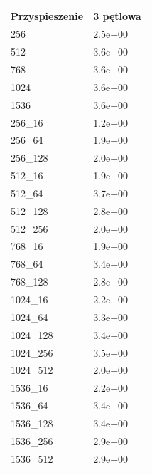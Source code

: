 \documentclass{scrartcl}
\begin{document}
\begin{table}[H]
\begin{tabular}{|l|l|}
\hline
Przyspieszenie & 3 pętlowa \\ \hline
256            & 2.5e+00   \\ \hline
512            & 3.6e+00   \\ \hline
768            & 3.6e+00   \\ \hline
1024           & 3.6e+00   \\ \hline
1536           & 3.6e+00   \\ \hline
256\_16        & 1.2e+00       \\ \hline
256\_64        & 1.9e+00       \\ \hline
256\_128       & 2.0e+00       \\ \hline
512\_16        & 1.9e+00       \\ \hline
512\_64        & 3.7e+00       \\ \hline
512\_128       & 2.8e+00       \\ \hline
512\_256       & 2.0e+00       \\ \hline
768\_16        & 1.9e+00       \\ \hline
768\_64        & 3.4e+00       \\ \hline
768\_128       & 2.8e+00       \\ \hline
1024\_16       & 2.2e+00       \\ \hline
1024\_64       & 3.3e+00       \\ \hline
1024\_128      & 3.4e+00       \\ \hline
1024\_256      & 3.5e+00       \\ \hline
1024\_512      & 2.0e+00       \\ \hline
1536\_16       & 2.2e+00       \\ \hline
1536\_64       & 3.4e+00       \\ \hline
1536\_128      & 3.4e+00       \\ \hline
1536\_256      & 2.9e+00       \\ \hline
1536\_512      & 2.9e+00       \\ \hline
\end{tabular}
\end{table}
\end{document}

